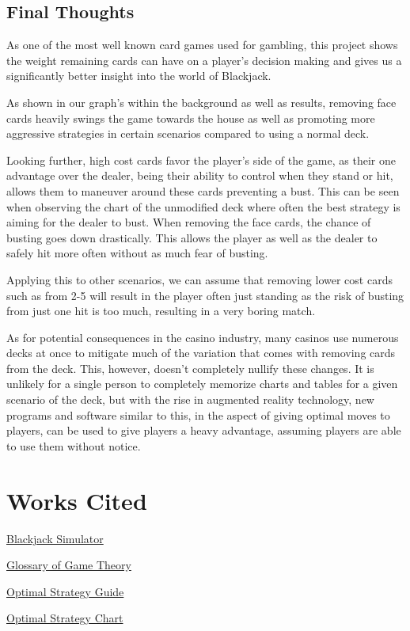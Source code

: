 \documentclass{article}
\begin{document}
{        \subsection{Final Thoughts}
	\label{Final Thoughts}

        As one of the most well known card games used for gambling, this project shows the weight remaining cards can have on a player's decision making and gives us a significantly better insight into the world of Blackjack. 
        
        As shown in our graph's within the background as well as results, removing face cards heavily swings the game towards the house as well as promoting more aggressive strategies in certain scenarios compared to using a normal deck. 
        
        Looking further, high cost cards favor the player's side of the game, as their one advantage over the dealer, being their ability to control when they stand or hit, allows them to maneuver around these cards preventing a bust. This can be seen when observing the chart of the unmodified deck where often the best strategy is aiming for the dealer to bust. When removing the face cards, the chance of busting goes down drastically. This allows the player as well as the dealer to safely hit more often without as much fear of busting. 

        Applying this to other scenarios, we can assume that removing lower cost cards such as from 2-5 will result in the player often just standing as the risk of busting from just one hit is too much, resulting in a very boring match. 
        
        As for potential consequences in the casino industry, many casinos use numerous decks at once to mitigate much of the variation that comes with removing cards from the deck. This, however, doesn't completely nullify these changes. It is unlikely for a single person to completely memorize charts and tables for a given scenario of the deck, but with the rise in augmented reality technology, new programs and software similar to this, in the aspect of giving optimal moves to players, can be used to give players a heavy advantage, assuming players are able to use them without notice.

	\section{Works Cited}
	\label{sec: Works Cited}

	\href{https://github.com/hosua/blackjack-cs241}{Blackjack Simulator}

	\href{https://en.wikipedia.org/wiki/Glossary\_of\_game\_theory}{Glossary of Game Theory}

	\href{https://www.kjartan.co.uk/games/blackjack.htm}{Optimal Strategy Guide}

	\href{https://www.kjartan.co.uk/games/pix/cards/Blackjack%20full%20guide.pdf}{Optimal Strategy Chart}
}
\end{document}
